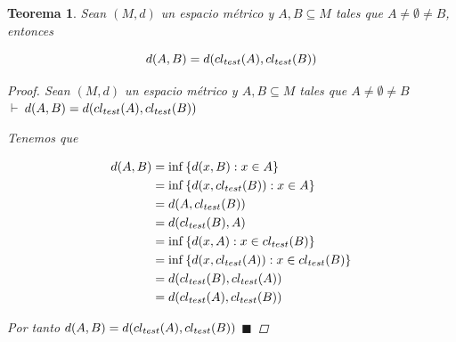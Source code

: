 \documentclass[oneside]{book} %
\theoremstyle{Teorema}
\newtheorem{Teorema}[Definicion]{Teorema}
\theoremstyle{Ejemplos}
\theoremstyle{[Obs]}
\def \test {test}
\newcommand{\cerradura}[2][\test]{\ifx \test #1 {\overline{#2}} \else {cl_{#1}(#2)} \fi} %
\renewcommand{\{}{\left\lbrace} %
\renewcommand{\}}{\right\rbrace} %
\renewcommand{\sc}{\subseteq} %
\renewcommand{\qed}{$\blacksquare$} %
\newcommand{\pd}{$\vdash\ $} %
\begin{document}
			\begin{Teorema}\setlength{\parindent}{0em}
			
				Sean $(M, d)$ un espacio métrico y $A, B \sc M$ tales que $A \neq \emptyset \neq B$, entonces 

				\[ d(A, B) = d(\cerradura{A}, \cerradura{B}) \]
			
				\begin{proof}
					
					Sean $(M, d)$ un espacio métrico y $A, B \sc M$ tales que $A \neq \emptyset \neq B$ \\ 
					\pd $d(A, B) = d(\cerradura{A}, \cerradura{B})$

					Tenemos que 

					\begin{align*}
						d(A, B) &= \inf\{ d(x, B) : x \in A \} \\
						&= \inf\{ d(x, \cerradura{B}) : x \in A \} \\
						&= d(A, \cerradura{B}) \\ 
						&= d(\cerradura{B}, A) \\ 
						&= \inf\{ d(x, A) : x \in \cerradura{B} \} \\ 
						&= \inf\{ d(x, \cerradura{A}) : x \in \cerradura{B} \} \\ 
						&= d(\cerradura{B}, \cerradura{A}) \\ 
						&= d(\cerradura{A}, \cerradura{B}) 
					\end{align*}

					Por tanto $d(A, B) = d(\cerradura{A}, \cerradura{B})$ \qed

				\end{proof}

			\end{Teorema}
\end{document}
